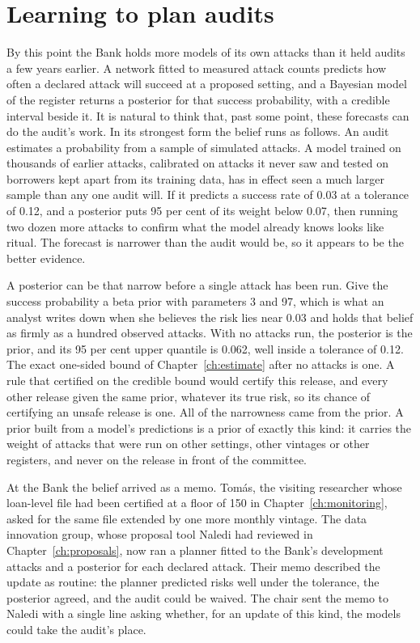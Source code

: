 \chapter{Learning to plan audits}\label{ch:planner}

By this point the Bank holds more models of its own attacks than it held audits a few years
earlier. A network fitted to measured attack counts predicts how often a declared attack will
succeed at a proposed setting, and a Bayesian model of the register returns a posterior for that
success probability, with a credible interval beside it. It is natural to think that, past some
point, these forecasts can do the audit's work. In its strongest form the belief runs as follows.
An audit estimates a probability from a sample of simulated attacks. A model trained on thousands
of earlier attacks, calibrated on attacks it never saw and tested on borrowers kept apart from its
training data, has in effect seen a much larger sample than any one audit will. If it predicts a
success rate of 0.03 at a tolerance of 0.12, and a posterior puts 95 per cent of its weight below
0.07, then running two dozen more attacks to confirm what the model already knows looks like
ritual. The forecast is narrower than the audit would be, so it appears to be the better evidence.

A posterior can be that narrow before a single attack has been run. Give the success probability
a beta prior with parameters 3 and 97, which is what an analyst writes down when she believes the
risk lies near 0.03 and holds that belief as firmly as a hundred observed attacks. With no attacks
run, the posterior is the prior, and its 95 per cent upper quantile is 0.062, well inside a
tolerance of 0.12. The exact one-sided bound of Chapter~\ref{ch:estimate} after no attacks is one. A rule that
certified on the credible bound would certify this release, and every other release given the
same prior, whatever its true risk, so its chance of certifying an unsafe release is one. All of
the narrowness came from the prior. A prior built from a model's predictions is a prior of exactly
this kind: it carries the weight of attacks that were run on other settings, other vintages or
other registers, and never on the release in front of the committee.

At the Bank the belief arrived as a memo. Tom\'as, the visiting researcher whose loan-level file
had been certified at a floor of 150 in Chapter~\ref{ch:monitoring}, asked for the same file extended by one more
monthly vintage. The data innovation group, whose proposal tool Naledi had reviewed in
Chapter~\ref{ch:proposals}, now ran a planner fitted to the Bank's development attacks and a posterior for each
declared attack. Their memo described the update as routine: the planner predicted risks well
under the tolerance, the posterior agreed, and the audit could be waived. The chair sent the memo
to Naledi with a single line asking whether, for an update of this kind, the models could take the
audit's place.

